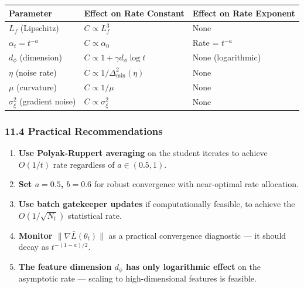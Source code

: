 \documentclass[
  12pt,
]{ctexart}
\providecommand{\tightlist}{%
  \setlength{\itemsep}{0pt}\setlength{\parskip}{0pt}}
\begin{document}
\begin{longtable}[]{@{}
  >{\raggedright\arraybackslash}p{}
  >{\raggedright\arraybackslash}p{}
  >{\raggedright\arraybackslash}p{}@{}}
\toprule\noalign{}
\begin{minipage}[b]{\linewidth}\raggedright
Parameter
\end{minipage} & \begin{minipage}[b]{\linewidth}\raggedright
Effect on Rate Constant
\end{minipage} & \begin{minipage}[b]{\linewidth}\raggedright
Effect on Rate Exponent
\end{minipage} \\
\midrule\noalign{}
\endhead
\bottomrule\noalign{}
\endlastfoot
\(L_f\) (Lipschitz) & \(C \propto L_f^3\) & None \\
\(\alpha_t = t^{-a}\) & \(C \propto \alpha_0\) & Rate = \(t^{-a}\) \\
\(d_\phi\) (dimension) & \(C \propto 1 + \gamma d_\phi \log t\) & None
(logarithmic) \\
\(\eta\) (noise rate) & \(C \propto 1/\Delta_{\min}^2(\eta)\) & None \\
\(\mu\) (curvature) & \(C \propto 1/\mu\) & None \\
\(\sigma_\xi^2\) (gradient noise) & \(C \propto \sigma_\xi^2\) & None \\
\end{longtable}

\subsubsection{11.4 Practical
Recommendations}\label{practical-recommendations}

\begin{enumerate}
\def\labelenumi{\arabic{enumi}.}
\tightlist
\item
  \textbf{Use Polyak-Ruppert averaging} on the student iterates to
  achieve \(O(1/t)\) rate regardless of \(a \in (0.5, 1)\).
\item
  \textbf{Set \(a = 0.5\), \(b = 0.6\)} for robust convergence with
  near-optimal rate allocation.
\item
  \textbf{Use batch gatekeeper updates} if computationally feasible, to
  achieve the \(O(1/\sqrt{N_t})\) statistical rate.
\item
  \textbf{Monitor \(\|\nabla \bar{L}(\theta_t)\|\)} as a practical
  convergence diagnostic --- it should decay as \(t^{-(1-a)/2}\).
\item
  \textbf{The feature dimension \(d_\phi\) has only logarithmic effect}
  on the asymptotic rate --- scaling to high-dimensional features is
  feasible.
\end{enumerate}
\end{document}
